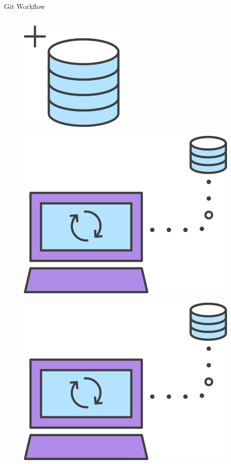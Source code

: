 \documentclass[xcolor=dvipsnames,t]{beamer}
\begin{document}
\begin{frame}[fragile]{Git Workflow}
\begin{columns}[t]
	\begin{column}{.2\textwidth}
		\begin{figure}
			\centering			
			\includegraphics[width=0.4\linewidth]{figures/gitcreate}
		\end{figure}	
		\begin{figure}
			\centering			
			\includegraphics[width=0.6\linewidth]{figures/gitsync}
		\end{figure}
		\begin{figure}
			\centering			
			\includegraphics[width=0.6\linewidth]{figures/gitsync}
		\end{figure}
	\end{column}
\end{columns}

\end{frame}
\end{document}
